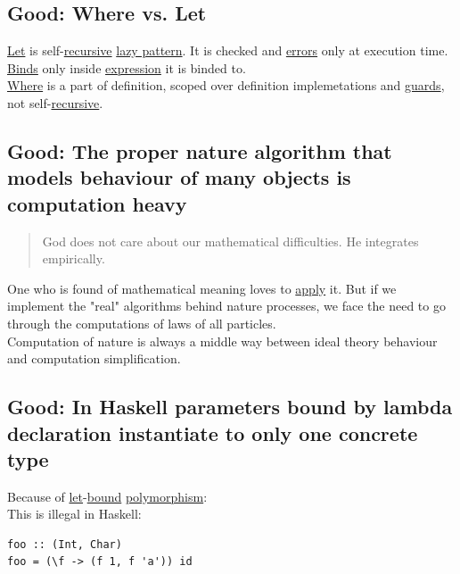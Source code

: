 \documentclass[11pt]{article}
\begin{document}
\subsection{\label{org7f8f8a6}Good: Where vs. Let}
\label{sec:org5daf789}
\hyperref[org77c82c3]{Let} is self-\hyperref[orgf513e66]{recursive} \hyperref[org618e055]{lazy pattern}. It is checked and \hyperref[org544dbf6]{errors} only at execution time. \hyperref[orgdb14c59]{Binds} only inside \hyperref[org9021dd7]{expression} it is binded to.\\

\hyperref[org3e5903d]{Where} is a part of definition, scoped over definition implemetations and \hyperref[orgc6782d2]{guards}, not self-\hyperref[orgf513e66]{recursive}.\\

\subsection{\label{org1e14ca4}Good: The proper nature algorithm that models behaviour of many objects is computation heavy}
\label{sec:orgc8877a4}
\begin{quote}
God does not care about our mathematical difficulties. He integrates empirically.\\
\end{quote}

One who is found of mathematical meaning loves to \hyperref[org644adf5]{apply} it. But if we implement the "real" algorithms behind nature processes, we face the need to go through the computations of laws of all particles.\\

Computation of nature is always a middle way between ideal theory behaviour and computation simplification.\\

\subsection{\label{org92471fa}Good: In Haskell parameters bound by lambda declaration instantiate to only one concrete type}
\label{sec:orgb29af58}
Because of \hyperref[org77c82c3]{let}-\hyperref[orgaac83d9]{bound} \hyperref[org64df340]{polymorphism}:\\

This is illegal in Haskell:\\
\begin{verbatim}
foo :: (Int, Char)
foo = (\f -> (f 1, f 'a')) id
\end{verbatim}
\end{document}
